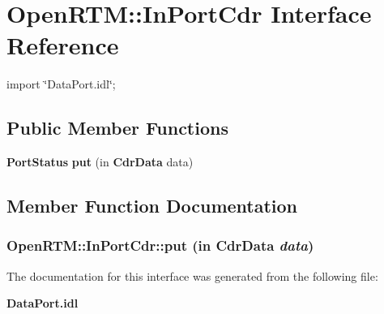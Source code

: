 \section{OpenRTM::InPortCdr Interface Reference}
\label{interfaceOpenRTM_1_1InPortCdr}


{\ttfamily import \char`\"{}DataPort.idl\char`\"{};}

\subsection*{Public Member Functions}
\begin{DoxyCompactItemize}
\item 
{\bf PortStatus} {\bf put} (in {\bf CdrData} data)
\end{DoxyCompactItemize}


\subsection{Member Function Documentation}
\subsubsection[{put}]{ OpenRTM::InPortCdr::put (in {\bf CdrData} {\em data})}\label{interfaceOpenRTM_1_1InPortCdr_a25c06cc0054c091c33dbe23398cc11c4}


The documentation for this interface was generated from the following file:\begin{DoxyCompactItemize}
\item 
{\bf DataPort.idl}\end{DoxyCompactItemize}
